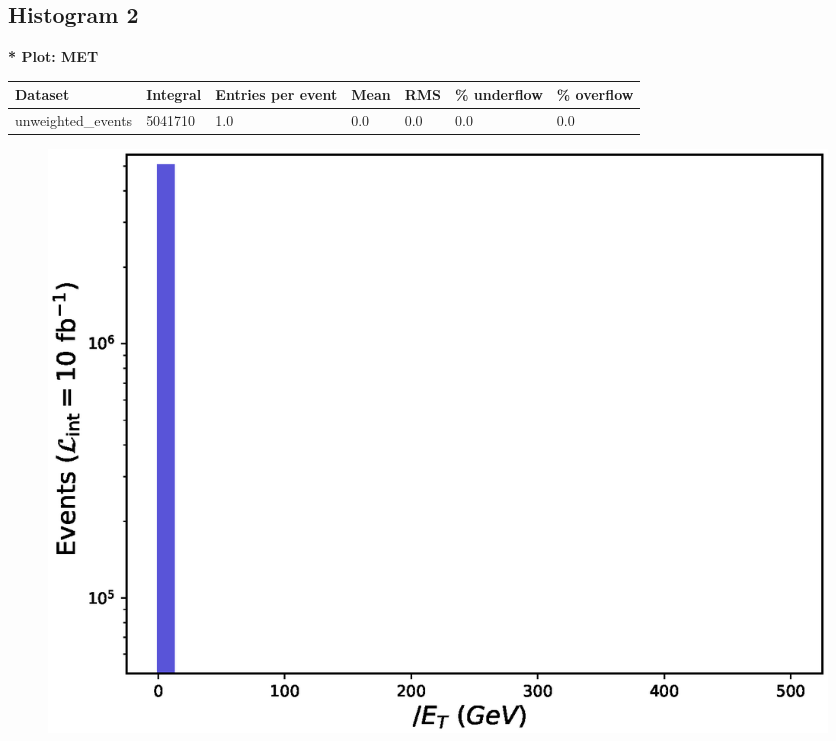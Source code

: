 \documentclass[a4paper, 10pt]{article}
\begin{document}
\subsection{ Histogram 2}

\textbf{* Plot: MET}\\
   \begin{table}[H]
  \begin{center}
    \begin{tabular}{|m{23.0mm}|m{23.0mm}|m{18.0mm}|m{19.0mm}|m{19.0mm}|m{19.0mm}|m{19.0mm}|}
      \hline
      {\cellcolor{yellow}         Dataset}& {\cellcolor{yellow}         Integral}& {\cellcolor{yellow}         Entries per event}& {\cellcolor{yellow}         Mean}& {\cellcolor{yellow}         RMS}& {\cellcolor{yellow}         \% underflow}& {\cellcolor{yellow}         \% overflow}\\
      \hline
      {\cellcolor{white}         unweighted\_events}& {\cellcolor{white}         5041710}& {\cellcolor{white}         1.0}& {\cellcolor{white}         0.0}& {\cellcolor{white}         0.0}& {\cellcolor{green}         0.0}& {\cellcolor{green}         0.0}\\
\hline
    \end{tabular}
  \end{center}
\end{table}

\begin{figure}[H]
  \begin{center}
    \includegraphics[scale=0.45]{selection_1.eps}\\
\caption{   }
  \end{center}
\end{figure}
      \newpage
\end{document}
